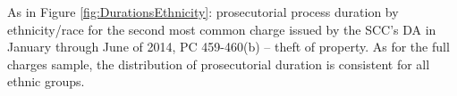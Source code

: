 As in Figure \ref{fig:DurationsEthnicity}: prosecutorial process duration by ethnicity/race for the second most common charge issued by the SCC's DA in January through June of 2014, PC 459-460(b) -- theft of property. As for the full charges sample, the distribution of prosecutorial duration is consistent for all ethnic groups.
\label{fig:2ndModal}